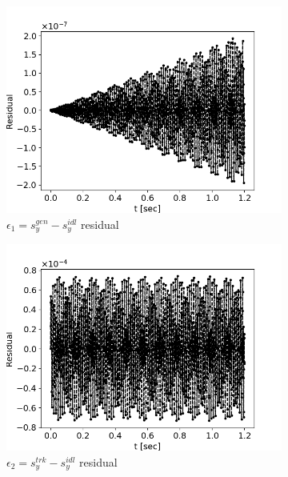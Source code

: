 \documentclass[a4paper]{jacow}
\begin{document}
\begin{figure}[h]
  \centering
  \begin{subfigure}{\linewidth}
    \centering
    \includegraphics[width=\linewidth]{../img/IPAC19/GEN-IDL_RESIDUAL}
    \caption{$\epsilon_1 = s_y^{gen} - s_y^{idl}$ residual\label{fig:res:gens}}
  \end{subfigure}
  \begin{subfigure}{\linewidth}
    \centering
    \includegraphics[width=\linewidth]{../img/IPAC19/TRK-IDL_RESIDUAL}
    \caption{$\epsilon_2 = s_y^{trk} - s_y^{idl}$ residual\label{fig:res:trkr}}
  \end{subfigure}
  \begin{subfigure}{\linewidth}
    \centering

\end{subfigure}
\end{figure}
\end{document}
